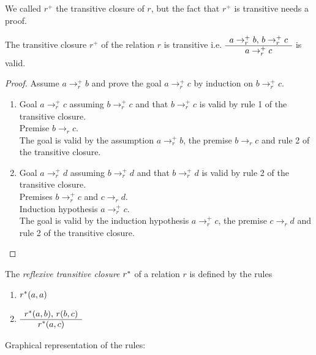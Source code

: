 We called $r^+$ the transitive closure of $r$, but the fact that $r^+$ is
transitive needs a proof.

\begin{theorem}
  \label{plustransitive}
  The transitive closure $r^+$ of the relation $r$ is transitive
  i.e. $\begin{array}{c} a \to_r^+ b, \, b \to_r^+ c \\ \hline a \to_r^+ c\end{array}$ is valid.
  \begin{proof}
    Assume $a \to_r^+ b$ and prove the goal $a \to_r^+ c$ by induction on
    $b \to_r^+ c$.
    \begin{enumerate}
    \item
      Goal $a \to_r^+ c$ assuming $b \to_r^+ c$ and that
      $b \to_r^+ c$ is valid by rule 1 of the transitive closure.\\
      Premise $b \to_r c$.\\
      The goal is valid by the assumption $a \to_r^+ b$, the premise $b \to_r
      c$ and rule 2 of the transitive closure.

    \item
      Goal $a \to_r^+d$ assuming $b \to_r^+ d$ and that
      $b \to_r^+ d$ is valid by rule 2 of the transitive closure. \\
      Premises $b \to_r^+ c$ and $c \to_r d$.\\
      Induction hypothesis $a \to_r^+ c$.\\
      The goal is valid by the induction hypothesis $a \to_r^+ c$, the premise
      $c \to_r d$ and rule 2 of the transitive closure.
    \end{enumerate}
  \end{proof}
\end{theorem}




\begin{definition} The \emph{reflexive transitive closure} $r^*$ of a relation $r$ is
  defined by the rules
  \begin{enumerate}
  \item $r^*(a,a)$
  \item $\begin{array}{c} r^*(a,b), \, r(b,c) \\ \hline r^*(a,c)\end{array}$
  \end{enumerate}
\end{definition}

Graphical representation of the rules:


